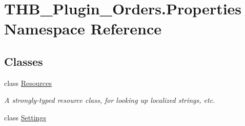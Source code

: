 \hypertarget{namespace_t_h_b___plugin___orders_1_1_properties}{}\section{T\+H\+B\+\_\+\+Plugin\+\_\+\+Orders.\+Properties Namespace Reference}
\label{namespace_t_h_b___plugin___orders_1_1_properties}
\subsection*{Classes}
\begin{DoxyCompactItemize}
\item 
class \mbox{\hyperlink{class_t_h_b___plugin___orders_1_1_properties_1_1_resources}{Resources}}
\begin{DoxyCompactList}\small\item\em A strongly-\/typed resource class, for looking up localized strings, etc. \end{DoxyCompactList}\item 
class \mbox{\hyperlink{class_t_h_b___plugin___orders_1_1_properties_1_1_settings}{Settings}}
\end{DoxyCompactItemize}
